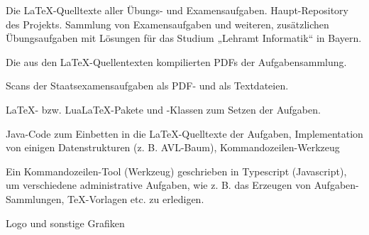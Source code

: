 \documentclass{bschlangaul-basis}
\begin{document}
\begin{description}
{Die LaTeX-Quelltexte aller Übungs- und Examensaufgaben.
Haupt-Repository des Projekts. Sammlung von Examensaufgaben und
weiteren, zusätzlichen Übungsaufgaben mit Lösungen für das Studium
„Lehramt Informatik“ in Bayern.}

{Die aus den LaTeX-Quellentexten kompilierten PDFs der Aufgabensammlung.}

{Scans der Staatsexamensaufgaben als PDF- und als Textdateien.}

{LaTeX- bzw. LuaLaTeX-Pakete und -Klassen zum Setzen der Aufgaben.}

{Java-Code zum Einbetten in die LaTeX-Quelltexte der Aufgaben,
Implementation von einigen Datenstrukturen (z. B. AVL-Baum),
Kommandozeilen-Werkzeug}

{Ein Kommandozeilen-Tool (Werkzeug) geschrieben in Typescript
(Javascript), um verschiedene administrative Aufgaben, wie z. B. das
Erzeugen von Aufgaben-Sammlungen, TeX-Vorlagen etc. zu erledigen.}

{Logo und sonstige Grafiken}
\end{description}
\end{document}
